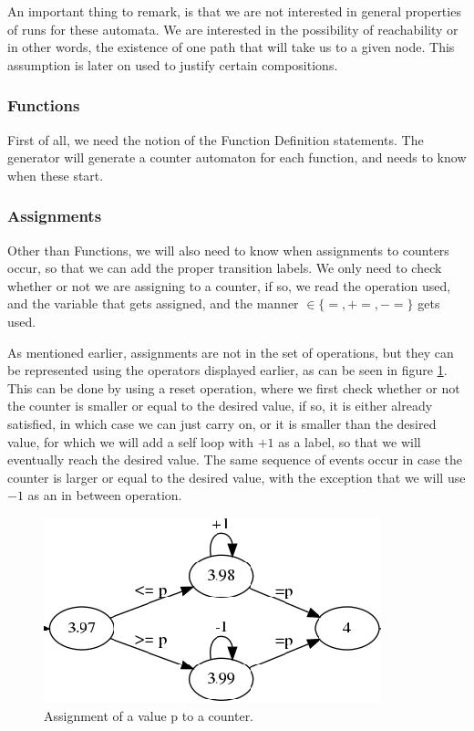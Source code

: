 \documentclass[12pt]{article}
\begin{document}
An important thing to remark, is that we are not interested in general properties of runs for these automata. We are interested in the possibility of reachability or in other words, the existence of one path that will take us to a given node. This assumption is later on used to justify certain compositions.

\subsubsection{Functions}
First of all, we need the notion of the Function Definition statements. The generator will generate a counter automaton for each function, and needs to know when these start.

\subsubsection{Assignments}
Other than Functions, we will also need to know when assignments to counters occur, so that we can add the proper transition labels. We only need to check whether or not we are assigning to a counter, if so, we read the operation used, and the variable that gets assigned, and the manner $\in \{=, +=, -=\}$ gets used. 

As mentioned earlier, assignments are not in the set of operations, but they can be represented using the operators displayed earlier, as can be seen in figure \ref{fig:counter_assignment}. This can be done by using a reset operation, where we first check whether or not the counter is smaller or equal to the desired value, if so, it is either already satisfied, in which case we can just carry on, or it is smaller than the desired value, for which we will add a self loop with $+1$ as a label, so that we will eventually reach the desired value. The same sequence of events occur in case the counter is larger or equal to the desired value, with the exception that we will use $-1$ as an in between operation.

\begin{figure}[h]
	\centering
	\includegraphics[width=0.48\linewidth]{counter_assignment}
	\caption{Assignment of a value p to a counter.}
	\label{fig:counter_assignment}
\end{figure}
\end{document}
